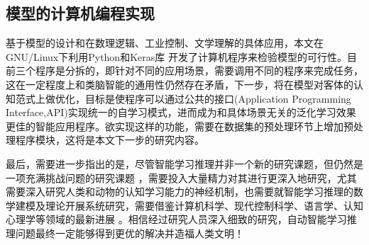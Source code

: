 \subsection{模型的计算机编程实现}
基于模型的设计和在数理逻辑、工业控制、文学理解的具体应用，本文在GNU/Linux下利用Python和Keras库  开发了计算机程序来检验模型的可行性。目前三个程序是分拆的，即针对不同的应用场景，需要调用不同的程序来完成任务，这在一定程度上和类脑智能的通用性仍然存在矛盾，下一步，将在模型对客体的认知范式上做优化，目标是使程序可以通过公共的接口(Application Programming Interface,API)实现统一的自学习模式，进而成为和具体场景无关的泛化学习效果更佳的智能应用程序。欲实现这样的功能，需要在数据集的预处理环节上增加预处理程序模块，这将是本文下一步的研究内容。


最后，需要进一步指出的是，尽管智能学习推理并非一个新的研究课题，但仍然是一项充满挑战问题的研究课题  ，需要投入大量精力对其进行更深入地研究，尤其需要深入研究人类和动物的认知学习能力的神经机制，也需要就智能学习推理的数学建模及理论开展系统研究，需要借鉴计算机科学、现代控制科学、语言学、认知心理学等领域的最新进展 。相信经过研究人员深入细致的研究，自动智能学习推理问题最终一定能够得到更优的解决并造福人类文明！